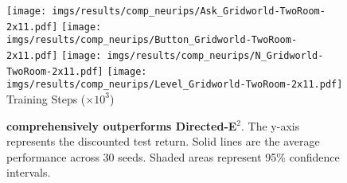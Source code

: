 \begin{figure}[tbh]
    \hfill
    \texttt{[image: imgs/results/comp\_neurips/Ask\_Gridworld-TwoRoom-2x11.pdf]}
    \hfill
     \texttt{[image: imgs/results/comp\_neurips/Button\_Gridworld-TwoRoom-2x11.pdf]} 
    \hfill
    \texttt{[image: imgs/results/comp\_neurips/N\_Gridworld-TwoRoom-2x11.pdf]}
    \hfill
    \texttt{[image: imgs/results/comp\_neurips/Level\_Gridworld-TwoRoom-2x11.pdf]}
    \\[-1.5pt]
    {\scriptsize{Training Steps ($\times 10^3$)}}
    \caption{\textbf{\thealgo comprehensively outperforms Directed-E$^2$}. The y-axis represents the discounted test return. Solid lines are the average performance across 30 seeds. Shaded areas represent 95\% confidence intervals.}
    \label{fig:double_mbie_outperform_dee}
\end{figure}
%
%
%